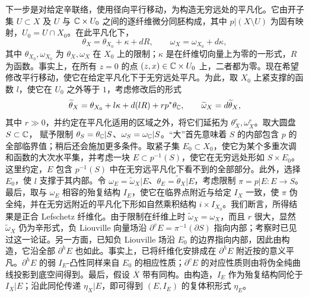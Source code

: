 下一步是对给定辛联络，使用径向平行移动，为构造无穷远处的平凡化。它由开子集 $U\subset X$ 及 $U$ 与 $\mathbb C\times U_0$ 之间的逐纤维微分同胚构成，其中 $p|(X\setminus U)$ 为固有映射，$U_0=U\cap X_0$。在此平凡化下，
\[
\theta_X=\theta_{X_0}+\kappa+dR,\qquad
\omega_X=\omega_{X_0}+d\kappa,
\]
其中 $\theta_{X_0},\omega_{X_0}$ 为 $\theta_X,\omega_X$ 在 $X_0$ 上的限制；$\kappa$ 是在纤维切向量上为零的一形式，$R$ 为函数。事实上，在所有 $z=0$ 的点 $(z,x)\in\mathbb C\times U_0$ 上，二者都为零。现在希望修改平行移动，使它在给定平凡化下于无穷远处平凡。为此，取 $X_0$ 上紧支撑的函数 $l$，使它在 $U_0$ 之外等于 $1$，考虑修改后的形式
\begin{equation}\label{eq:19.3}
\widetilde\theta_X=\theta_{X_0}+l\kappa+d(lR)+rp^*\theta_{\mathbb C},\qquad
\widetilde\omega_X=d\widetilde\theta_X,
\end{equation}
其中 $r\gg0$，并约定在平凡化适用的区域之外，将它们延拓为 $\theta_X^r,\omega_X^r$。取大圆盘 $S\subset\mathbb C$，
赋予限制 $\theta_S=\theta_{\mathbb C}|S$、$\omega_S=\omega_{\mathbb C}|S$。“大”首先意味着 $S$ 的内部包含 $p$ 的全部临界值；稍后还会施加更多条件。取紧子集 $E_0\subset X_0$，使它为某个多重次调和函数的大次水平集，并考虑一块 $E\subset p^{-1}(S)$，使它在无穷远处形如 $S\times E_0$。这里约定，$E$ 包含 $p^{-1}(S)$ 中在无穷远平凡化下看不到的全部部分。此外，选择 $E_0$，使 $l$ 支撑于其内部。令 $\omega_E=\widetilde\omega_X|E$、$\theta_E=\widetilde\theta_X|E$，考虑限制 $\pi=p|E:E\to S$。最后，取与 $\omega_E$ 相容的殆复结构 $I_E$，使它在临界点附近与给定 $I_X$ 一致，使 $\pi$ 伪全纯，并在无穷远附近的平凡化下形如自然乘积结构 $i\times I_{X_0}$。我们断言，所得结果是正合 Lefschetz 纤维化。由于限制在纤维上时 $\widetilde\omega_X=\omega_X$，而且 $r$ 很大，显然 $\widetilde\omega_X$ 仍为辛形式，负 Liouville 向量场沿 $\partial^vE=\pi^{-1}(\partial S)$ 指向内部；考察时已见过这一论证。另一方面，已知负 Liouville 场沿 $E_0$ 的边界指向内部，因此由构造，它沿全部 $\partial^hE$ 也如此。事实上，已将纤维化安排成在 $\partial^hE$ 附近按的意义平凡。$\partial^hE$ 的弱 $I_E$-凸性同样来自 $E_0$ 的相应性质；$\partial^vE$ 的对应性质则由将伪全纯曲线投影到底空间得到。最后，假设 $\overline X$ 带有同构。由构造，$I_E$ 作为殆复结构同伦于 $I_X|E$；沿此同伦传递 $\eta_X|E$，即可得到 $(E,I_E)$ 的复体积形式 $\eta_E$。


